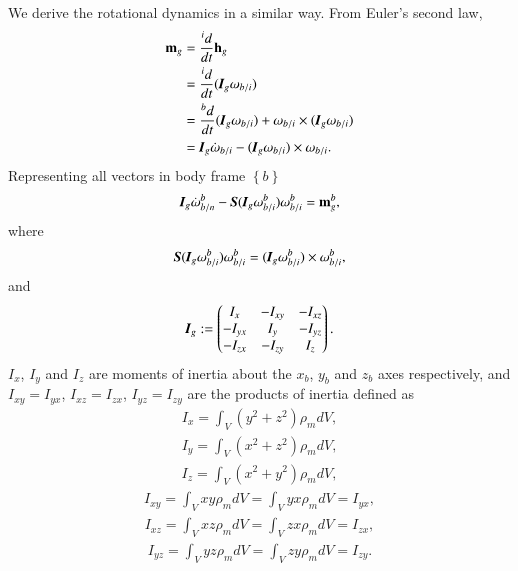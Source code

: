 We derive the rotational dynamics in a similar way. From Euler's second law, 
\begin{align}
\vec{m}_{g}&=\dfrac{^{i}d}{dt}\vec{h}_{g} \nonumber \\
&=\dfrac{^{i}d}{dt}(\emph{\textbf{I}}_{g}\vec{\omega}_{b/i}) \nonumber \\
&=\dfrac{^{b}d}{dt}(\emph{\textbf{I}}_{g}\vec{\omega}_{b/i})+\vec{\omega}_{b/i}\times(\emph{\textbf{I}}_{g}\vec{\omega}_{b/i})\nonumber \\
&=\emph{\textbf{I}}_{g}\dot{\vec{\omega}}_{b/i}-
(\emph{\textbf{I}}_{g}\vec{\omega}_{b/i})\times \vec{\omega}_{b/i}.
\end{align}
Representing all vectors in body frame $\left\{ b \right\}$
\begin{align}
\emph{\textbf{I}}_{g}\dot{\vec{\omega}}^{b}_{b/n}-
\emph{\textbf{S}}(\emph{\textbf{I}}_{g}\vec{\omega}^{b}_{b/i})\vec{\omega}^{b}_{b/i}=\vec{m}^{b}_{g},\label{EQ:RDCG}
\end{align}
where
\begin{align}
\emph{\textbf{S}}(\emph{\textbf{I}}_{g}\vec{\omega}^{b}_{b/i})\vec{\omega}^{b}_{b/i}=
(\emph{\textbf{I}}_{g}\vec{\omega}^{b}_{b/i})\times
\vec{\omega}^{b}_{b/i},
\end{align}
and
\begin{align}
\emph{\textbf{I}}_{g}:=
\begin{pmatrix}
I_{x}&-I_{xy}&-I_{xz}\\
-I_{yx}&I_{y}&-I_{yz}\\
-I_{zx}&-I_{zy}&I_{z}
\end{pmatrix}.
\end{align}
$I_{x}$, $I_{y}$ and $I_{z}$ are moments of inertia about the $x_{b}$, $y_{b}$ and $z_{b}$ axes respectively, and $I_{xy}=I_{yx}$, $I_{xz}=I_{zx}$, $I_{yz}=I_{zy}$ are the products of inertia defined as
\begin{align}
I_{x}=\int_{V}(y^{2}+z^{2})\rho_{m}dV,
\end{align}
\begin{align}
I_{y}=\int_{V}(x^{2}+z^{2})\rho_{m}dV,
\end{align}
\begin{align}
I_{z}=\int_{V}(x^{2}+y^{2})\rho_{m}dV,
\end{align}
\begin{align}
I_{xy}=\int_{V}xy\rho_{m}dV=\int_{V}yx\rho_{m}dV=I_{yx},
\end{align}
\begin{align}
I_{xz}=\int_{V}xz\rho_{m}dV=\int_{V}zx\rho_{m}dV=I_{zx},
\end{align}
\begin{align}
I_{yz}=\int_{V}yz\rho_{m}dV=\int_{V}zy\rho_{m}dV=I_{zy}.
\end{align}


